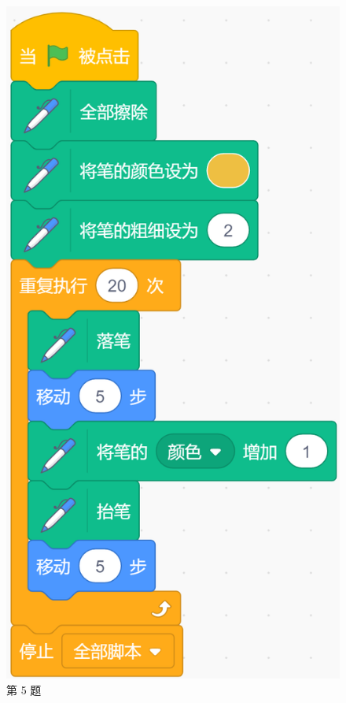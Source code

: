 \documentclass[10pt, a4paper]{article}
\begin{document}
\begin{enumerate}
\begin{figure}[htbp]
            \begin{minipage}[t]{.14\textwidth}
                \centering
                \includegraphics[width=\textwidth]{5.png}
                \caption*{第 5 题}
            \end{minipage}
        \end{figure}


\end{enumerate}
\end{document}
